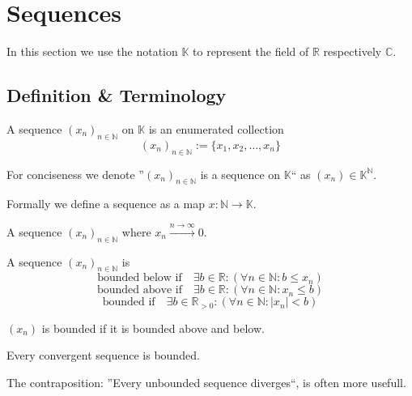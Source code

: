\section{Sequences}
In this section we use the notation \(\mathbb{K}\) to represent the field of \(\mathbb{R}\) respectively \(\mathbb{C}\).

\subsection{Definition \& Terminology}
\begin{definition}[Sequence]
   A sequence \((x_n)_{n \in \mathbb{N}}\) on \(\mathbb{K}\) is an enumerated collection
   \[(x_n)_{n \in \mathbb{N}} := \{x_1, x_2, \ldots, x_n\}\]
\end{definition}
\begin{remark}[Notation]
   For conciseness we denote ''\((x_n)_{n \in \mathbb{N}}\) is a sequence on \(\mathbb{K}\)`` as \((x_n) \in \mathbb{K}^\mathbb{N}\).
\end{remark}
\begin{remark}
   Formally we define a sequence as a map \(x: \mathbb{N} \to \mathbb{K}\).
\end{remark}

\begin{definition}
   A sequence \((x_n)_{n \in \mathbb{N}}\) where \(x_n \xrightarrow{n \to \infty} 0\).
\end{definition}

\begin{definition}
   A sequence \((x_n)_{n \in \mathbb{N}}\) is
   \[\text{bounded below if} \quad \exists b \in \mathbb{R}: (\forall n \in \mathbb{N}: b \leq x_n)\]
   \[\text{bounded above if} \quad \exists b \in \mathbb{R}: (\forall n \in \mathbb{N}: x_n \leq b)\]
   \[\text{bounded if} \quad \exists b \in \mathbb{R}_{>0}: (\forall n \in \mathbb{N}: |x_n| < b)\]
\end{definition}
\begin{remark}
   \((x_n)\) is bounded if it is bounded above and below.
\end{remark}

\begin{theorem}\label{thm:conv_bound}
   Every convergent sequence is bounded.
\end{theorem}
\begin{remark}
   The contraposition: ''Every unbounded sequence diverges``, is often more usefull.
\end{remark}

